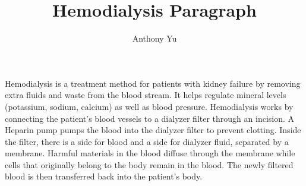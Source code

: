 \documentclass[12pt]{article}
\title{Hemodialysis Paragraph}
\author{Anthony Yu}
\begin{document}
\newcommand{\problem}[1]{\subsection*{Problem {#1}}}
\newenvironment{enumAlph}{\begin{enumerate}[label=(\alph*)]}{\end{enumerate}}

\makeatletter
\newcommand{\skipitems}[1]{%
\addtocounter{\@enumctr}{#1}%
}
\makeatother

\newcommand{\chunit}[3]{\qty{#1}{{#2}\,\ce{#3}}}
\newcommand{\chuniteval}[3]{\qty[evaluate-expression]{#1}{{#2}\,\ce{#3}}}

\newtheorem{definition}{Definition}

\maketitle

Hemodialysis is a treatment method for patients with kidney failure by removing extra
fluids and waste from the blood stream. It helps regulate mineral levels (potassium,
sodium, calcium) as well as blood pressure. Hemodialysis
works by connecting the patient's blood vessels to a dialyzer filter through
an incision. A Heparin pump pumps the blood into the dialyzer filter to 
prevent clotting. Inside the filter, there is a side for blood and a side
for dialyzer fluid, separated by a membrane. Harmful materials in the blood
diffuse through the membrane while cells that originally belong to the body 
remain in the blood. The newly filtered blood is then transferred back into 
the patient's body. 
\end{document}
